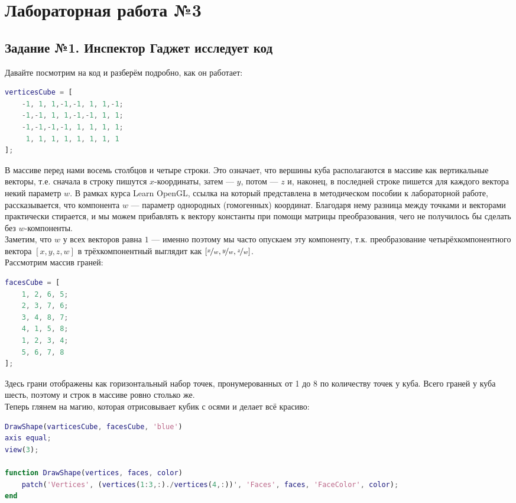 \documentclass[a3paper,14pt]{extarticle}
\begin{document}
\section*{\centering Лабораторная работа №3}
\subsection*{\centering Задание №1. Инспектор Гаджет исследует код}
Давайте посмотрим на код и разберём подробно, как он работает:
\begin{lstlisting}[language=Matlab]
verticesCube = [
    -1, 1, 1,-1,-1, 1, 1,-1;
    -1,-1, 1, 1,-1,-1, 1, 1;
    -1,-1,-1,-1, 1, 1, 1, 1;
     1, 1, 1, 1, 1, 1, 1, 1
];
\end{lstlisting}
В массиве перед нами восемь столбцов и четыре строки. Это означает, что вершины куба располагаются в массиве как вертикальные векторы, т.е. сначала в строку пишутся $x$-координаты, затем --- $y$, потом --- $z$ и, наконец, в последней строке пишется для каждого вектора некий параметр $w$. В рамках курса Learn OpenGL, ссылка на который представлена в методическом пособии к лабораторной работе, рассказывается, что компонента $w$ --- параметр однородных (гомогенных) координат. Благодаря нему разница между точками и векторами практически стирается, и мы можем прибавлять к вектору константы при помощи матрицы преобразования, чего не получилось бы сделать без $w$-компоненты.\\
Заметим, что $w$ у всех векторов равна $1$ --- именно поэтому мы часто опускаем эту компоненту, т.к. преобразование четырёхкомпонентного вектора $[x, y, z, w]$ в трёхкомпонентный выглядит как $[\nicefrac{x}{w}, \nicefrac{y}{w}, \nicefrac{z}{w}]$.\\[1em]
Рассмотрим массив граней:
\begin{lstlisting}[language=Matlab, firstnumber=8]
facesCube = [
    1, 2, 6, 5;
    2, 3, 7, 6;
    3, 4, 8, 7;
    4, 1, 5, 8;
    1, 2, 3, 4;
    5, 6, 7, 8
];
\end{lstlisting}
Здесь грани отображены как горизонтальный набор точек, пронумерованных от 1 до 8 по количеству точек у куба. Всего граней у куба шесть, поэтому и строк в массиве ровно столько же.\\[1em] 
Теперь глянем на магию, которая отрисовывает кубик с осями и делает всё красиво:
\begin{lstlisting}[language=Matlab, firstnumber=17]
DrawShape(varticesCube, facesCube, 'blue')
axis equal;
view(3);

function DrawShape(vertices, faces, color)
    patch('Vertices', (vertices(1:3,:)./vertices(4,:))', 'Faces', faces, 'FaceColor', color);
end
\end{lstlisting}
\end{document}
